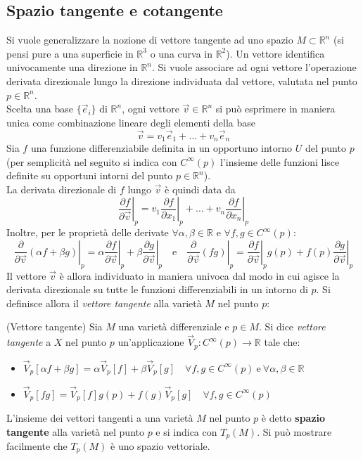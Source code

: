\subsection{Spazio tangente e cotangente}
Si vuole generalizzare la nozione di vettore tangente ad uno spazio
$M \subset \mathbb{R}^n$ (si pensi pure a una superficie in $\mathbb{R}^3$
o una curva in $\mathbb{R}^2$). Un vettore identifica univocamente una direzione
in $\mathbb{R}^n$. Si vuole associare ad ogni vettore l'operazione derivata direzionale
lungo la direzione individuata dal vettore, valutata nel punto $p \in \mathbb{R}^n$.\\
Scelta una base $\{\vec e _i\}$ di $\mathbb{R}^n$, ogni vettore $\vec v \in \mathbb{R}^n$
si può esprimere in maniera unica come combinazione lineare degli elementi della base
$$ \vec v = v_1\vec e _1 + \dots + v_n\vec e _n $$
Sia $f$ una funzione differenziabile definita in un opportuno intorno $U$ del punto $p$
(per semplicità nel seguito si indica con $C^\infty(p)$ l'insieme delle funzioni lisce definite su
opportuni intorni del punto $p \in \mathbb{R}^n$).\\
La derivata direzionale di $f$ lungo $\vec v$ è quindi data da
   $$ \left. \frac{\partial f}{\partial \vec v} \right |_p =
         \left. v_1\frac{\partial f}{\partial x_1} \right |_p + \dots +
         \left. v_n\frac{\partial f}{\partial x_n} \right |_p $$
Inoltre, per le proprietà delle derivate $\forall \alpha,\beta \in \mathbb{R}$
e $\forall f,g \in C^\infty(p)$:
$$
      \left. \frac{\partial}{\partial \vec v}(\alpha f + \beta g) \right |_p
         = \alpha \left. \frac{\partial f}{\partial \vec v} \right |_p +
           \beta  \left. \frac{\partial g}{\partial \vec v} \right |_p
      \quad \mathrm{e} \quad
      \left. \frac{\partial}{\partial \vec v}(fg) \right |_p
         = \left. \frac{\partial f}{\partial \vec v} \right |_p g(p) +
           \left. f(p)\frac{\partial g}{\partial \vec v} \right |_p
$$
Il vettore $\vec v$ è allora individuato in maniera univoca dal modo in cui agisce
la derivata direzionale su tutte le funzioni differenziabili in un intorno di $p$.
Si definisce allora il \emph{vettore tangente} alla varietà $M$ nel punto $p$:
\begin{definition}{(Vettore tangente)}
      Sia $M$ una varietà differenziale e $p \in M$. Si dice \emph{vettore tangente}
      a $X$ nel punto $p$ un'applicazione $\vec V _p : C^\infty(p) \to \mathbb{R}$ tale che:
      \begin{itemize}
         \item $\vec V _p[\alpha f + \beta g] = \alpha \vec V _p[f] + \beta \vec V_p [g]
            \quad \forall f,g \in C^\infty(p) \mathrm{\:e\:} \forall \alpha,\beta \in \mathbb{R}$
         \item $\vec V _p [fg] = \vec V _p[f] g(p) + f(g)\vec V _p [g]
            \quad \forall f,g \in C^\infty(p)$
      \end{itemize}
\end{definition}
L'insieme dei vettori tangenti a una varietà $M$ nel punto $p$ è detto \textbf{spazio tangente}
alla varietà nel punto $p$ e si indica con $T_p(M)$.
Si può mostrare facilmente che $T_p(M)$ è uno spazio vettoriale.\\

